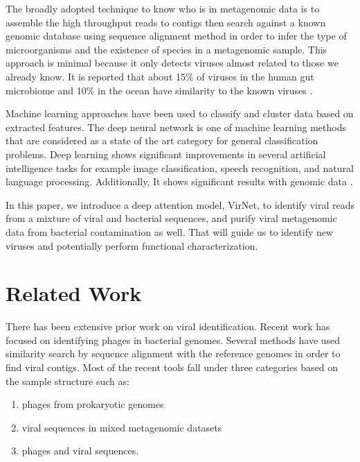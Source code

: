 \documentclass[conference]{IEEEtran}
\begin{document}
The broadly adopted technique to know who is in metagenomic data is to assemble the high throughput reads to contigs then search against a known genomic database using sequence alignment method in order to infer the type of microorganisms and the existence of species in a metagenomic sample. This approach is minimal because it only detects viruses almost related to those we already know. It is reported that about 15\% of viruses in the human gut microbiome and 10\% in the ocean have similarity to the known viruses \cite{ren2017virfinder}. 

Machine learning approaches have been used to classify and cluster data based on extracted features. The deep neural network is one of machine learning methods that are considered as a state of the art category for general classification problems. Deep learning shows significant improvements in several artificial intelligence tasks for example image classification, speech recognition, and natural language processing. Additionally, It shows significant results with genomic data \cite{angermueller2016deep}. %

In this paper, we introduce a deep attention model, VirNet, to identify viral reads from a mixture of viral and bacterial sequences, and purify viral metagenomic data from bacterial contamination as well. That will guide us to identify new viruses and potentially perform functional characterization. %

\section{Related Work}

There has been extensive prior work on viral identification. Recent work has focused on identifying phages in bacterial genomes. Several methods have used similarity search by sequence alignment with the reference genomes in order to find viral contigs. Most of the recent tools fall under three categories based on the sample structure such as:
\begin{enumerate}
	\item phages from prokaryotic genomes
	\item viral sequences in mixed metagenomic datasets
	\item phages and viral sequences. 
\end{enumerate} 
\end{document}
